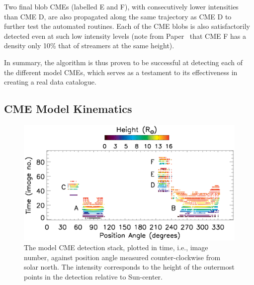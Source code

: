 \documentclass[preprint2]{aastex}
\newcommand{\RNum}[1]{\uppercase\expandafter{\romannumeral #1\relax}}
\begin{document}
Two final blob CMEs (labelled E and F), with consecutively lower intensities than CME D, are also propagated along the same trajectory as CME D to further test the automated routines. Each of the CME blobs is also satisfactorily detected even at such low intensity levels (note from Paper~\RNum{1} that CME F has a density only 10\% that of streamers at the same height).

In summary, the algorithm is thus proven to be successful at detecting each of the different model CMEs, which serves as a testament to its effectiveness in creating a real data catalogue.




\subsection{CME Model Kinematics}

\begin{figure}[!t]
\centerline{\includegraphics[scale=0.57, clip=true, trim=0 0 0 0, width=\linewidth]{figure_model_stack.eps}}
\caption{The model CME detection stack, plotted in time, i.e., image number, against position angle measured counter-clockwise from solar north. The intensity corresponds to the height of the outermost points in the detection relative to Sun-center.}
\label{figure_model_stack}
\end{figure}
\end{document}
